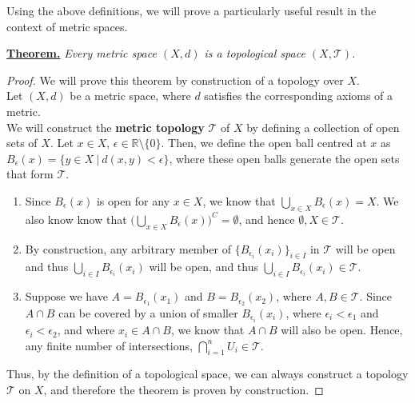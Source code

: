 \documentclass{article}
\begin{document}
\noindent Using the above definitions, we will prove a particularly useful result in the context of metric spaces.\\

\begin{bluebox}
\noindent\underline{\textbf{Theorem.}} \textit{Every metric space $(X,d)$ is a topological space $(X, \mathcal{T})$.}
\end{bluebox}
\begin{proof}
    We will prove this theorem by construction of a topology over $X$.\\

    \noindent Let $(X,d)$ be a metric space, where $d$ satisfies the corresponding axioms of a metric.\\

    \noindent We will construct the \textbf{metric topology} $\mathcal{T}$ of $X$ by defining a collection of open sets of $X$. Let $x\in X$, $\epsilon\in\mathbb{R}\setminus\{0\}$. Then, we define the open ball centred at $x$ as $B_{\epsilon}(x) = \{y\in X\:|\:d(x,y)<\epsilon\}$, where these open balls generate the open sets that form $\mathcal{T}$.

    \begin{enumerate}[label=(\roman*)]
    \item Since $B_{\epsilon}(x)$ is open for any $x\in X$, we know that $\displaystyle\bigcup_{x\in X}B_{\epsilon}(x) = X$. We also know know that $\Biggl(\displaystyle\bigcup_{x\in X}B_{\epsilon}(x)\Biggr)^{C} = \emptyset$, and hence $\emptyset, X\in\mathcal{T}$.

    \item By construction, any arbitrary member of $\bigl\{B_{\epsilon_{i}}(x_{i})\bigr\}_{i\in I}$ in $\mathcal{T}$ will be open and thus $\displaystyle\bigcup_{i\in I}B_{\epsilon_{i}}(x_{i})$ will be open, and thus $\displaystyle\bigcup_{i\in I}B_{\epsilon_{i}}(x_{i}) \in \mathcal{T}$.

    \item Suppose we have $A = B_{\epsilon_{1}}(x_{1})$ and $B = B_{\epsilon_{2}}(x_{2})$, where $A, B \in \mathcal{T}$. Since $A\cap B$ can be covered by a union of smaller $B_{\epsilon_{i}}(x_{i})$, where $\epsilon_{i}<\epsilon_{1}$ and $\epsilon_{i} < \epsilon_{2}$, and where $x_{i} \in A\cap B$, we know that $A\cap B$ will also be open. Hence, any finite number of intersections, $\displaystyle\bigcap_{i=1}^{n}U_{i}\in\mathcal{T}$.
    \end{enumerate}
    Thus, by the definition of a topological space, we can always construct a topology $\mathcal{T}$ on $X$, and therefore the theorem is proven by construction.
\end{proof}
\end{document}
